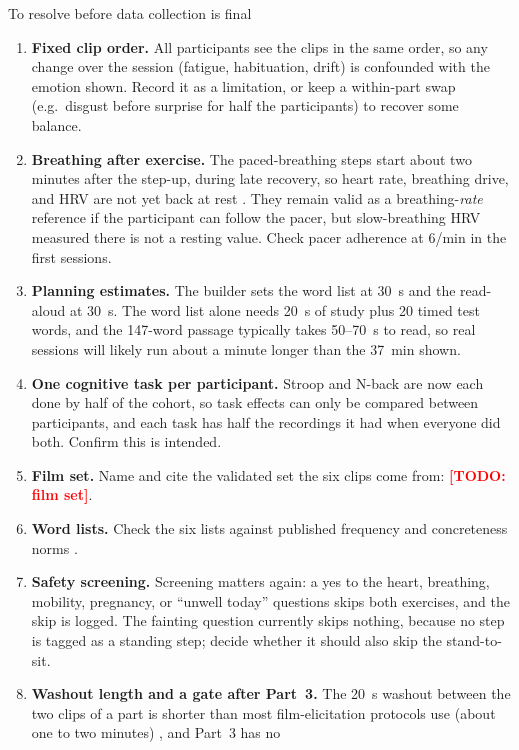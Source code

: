 \documentclass[11pt,a4paper]{article}
\newcommand{\TODO}[1]{\textcolor{red}{\textbf{[TODO: #1]}}}
\begin{document}
\begin{notebox}{To resolve before data collection is final}
\begin{enumerate}[leftmargin=*]
  \item \textbf{Fixed clip order.} All participants see the clips in the same order, so any change over the session
    (fatigue, habituation, drift) is confounded with the emotion shown. Record it as a limitation, or keep a
    within-part swap (e.g.\ disgust before surprise for half the participants) to recover some balance.
  \item \textbf{Breathing after exercise.} The paced-breathing steps start about two minutes after the step-up,
    during late recovery, so heart rate, breathing drive, and HRV are not yet back at rest \cite{stanley2013}. They
    remain valid as a breathing-\emph{rate} reference if the participant can follow the pacer, but slow-breathing HRV
    measured there is not a resting value. Check pacer adherence at 6/min in the first sessions.
  \item \textbf{Planning estimates.} The builder sets the word list at 30~s and the read-aloud at 30~s. The word list alone needs 20~s of study plus 20 timed test words, and the 147-word passage
    typically takes 50--70~s to read, so real sessions will likely run about a minute longer than the 37~min shown.
  \item \textbf{One cognitive task per participant.} Stroop and N-back are now each done by half of the cohort, so
    task effects can only be compared between participants, and each task has half the recordings it had when
    everyone did both. Confirm this is intended.
  \item \textbf{Film set.} Name and cite the validated set the six clips come from: \TODO{film set}.
  \item \textbf{Word lists.} Check the six lists against published frequency and concreteness norms
    \cite{brysbaert2014}.
  \item \textbf{Safety screening.} Screening matters again: a yes to the heart, breathing, mobility, pregnancy, or
    ``unwell today'' questions skips both exercises, and the skip is logged. The fainting question currently skips
    nothing, because no step is tagged as a standing step; decide whether it should also skip the stand-to-sit.
  \item \textbf{Washout length and a gate after Part~3.} The 20~s washout between the two clips of a part is shorter
    than most film-elicitation protocols use (about one to two minutes) \cite{rottenberg2007}, and Part~3 has no

\end{enumerate}
\end{notebox}
\end{document}
